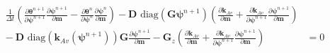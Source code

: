 \begin{align}
\label{eq:richards-timestep-deriv}
\frac{1}{\Delta t}
\left(
    \frac{\partial \boldsymbol{\theta}^{n+1}}{\partial\boldsymbol{\psi}^{n+1}}
    \frac{\partial \boldsymbol{\psi}^{n+1}}{\partial\mathbf{m}}
    -
    \frac{\partial \boldsymbol{\theta}^n}{\partial\boldsymbol{\psi}^n}
    \frac{\partial \boldsymbol{\psi}^n}{\partial\mathbf{m}}
\right)
-
\mathbf{D}
    \text{ diag}\left( \mathbf{G} \boldsymbol{\psi}^{n+1} \right)
    \left(
        \frac{\partial \mathbf{k}_{Av}}{\partial\mathbf{m}} +
        \frac{\partial \mathbf{k}_{Av}}{\partial\boldsymbol{\psi}^{n+1}}
        \frac{\partial \boldsymbol{\psi}^{n+1}}{\partial\mathbf{m}}
    \right)
\nonumber\\
-\
\mathbf{D}
    \text{ diag}\left( \mathbf{k}_{Av}(\boldsymbol{\psi}^{n+1}) \right)
\mathbf{G}
\frac{\partial \boldsymbol{\psi}^{n+1}}{\partial\mathbf{m}}
-
\mathbf{G}_{z}
\left(
    \frac{\partial \mathbf{k}_{Av}}{\partial\mathbf{m}} +
    \frac{\partial \mathbf{k}_{Av}}{\partial\boldsymbol{\psi}^{n+1}}
    \frac{\partial \boldsymbol{\psi}^{n+1}}{\partial\mathbf{m}}
\right)
& = 0
\end{align}
